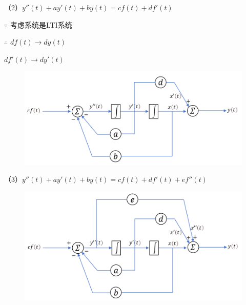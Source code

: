 \documentclass[UTF8]{ctexart}
\begin{document}
（2）$y''(t) + ay'(t) + by(t) = cf(t)+df'(t)$ \par
$\because $ 考虑系统是LTI系统  \par
$\therefore  $ $df(t)\longrightarrow dy(t)$ \par
\quad   $df'(t)\longrightarrow dy'(t)$ \par
\begin{figure}[h]
    \centering         %
    \includegraphics[scale=0.55]{3.png}
\end{figure}
（3）$y''(t) + ay'(t) + by(t) = cf(t)+df'(t)+ef''(t)$ \par
\begin{figure}[h]
    \centering         %
    \includegraphics[scale=0.55]{4.png}
\end{figure}
\end{document}
